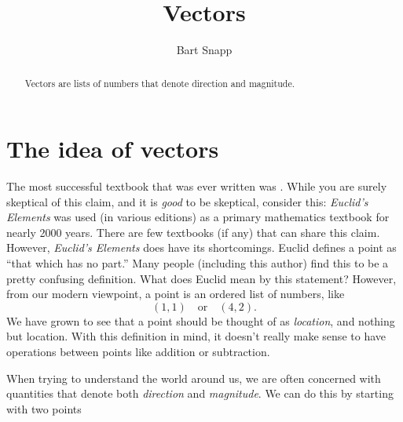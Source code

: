 \documentclass{ximera}
\author{Bart Snapp}
\title[Dig-In:]{Vectors}
\begin{document}
\begin{abstract}
  Vectors are lists of numbers that denote direction and magnitude.
\end{abstract}
\maketitle


\section{The idea of vectors}

The most successful textbook that was ever written was
. While
you are surely skeptical of this claim, and it is \textit{good} to be
skeptical, consider this: \textit{Euclid's Elements} was used (in
various editions) as a primary mathematics textbook for nearly 2000
years. There are few textbooks (if any) that can share this
claim. However, \textit{Euclid's Elements} does have its shortcomings. 
Euclid defines a point as ``that which has no part.'' Many people 
(including this author) find this to be 
a pretty confusing definition. What does Euclid mean by this statement? 
However, from our modern viewpoint, a point is an
ordered list of numbers, like
\[
(1,1)\quad\text{or}\quad(4,2).
\]
We have grown to see that a point should be thought of as
\textit{location}, and nothing but location. With this definition in mind, it
doesn't really make sense to have operations between points like
addition or subtraction.

When trying to understand the world around us, we are often concerned
with quantities that denote both \textit{direction} and
\textit{magnitude}. We can do this by starting with two points
\end{document}
